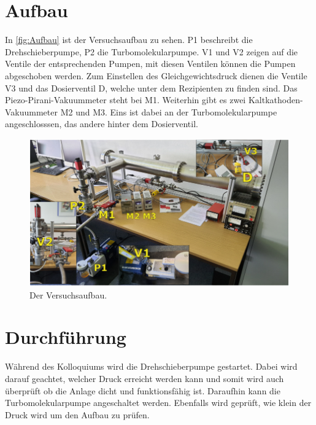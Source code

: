     \section{Aufbau}
        In \autoref{fig:Aufbau} ist der Versuchsaufbau zu sehen.
        P1 beschreibt die Drehschieberpumpe, P2 die Turbomolekularpumpe.
        V1 und V2 zeigen auf die Ventile der entsprechenden Pumpen, mit diesen Ventilen können die Pumpen abgeschoben werden.
        Zum Einstellen des Gleichgewichtsdruck dienen die Ventile V3 und das Dosierventil D, welche unter dem Rezipienten zu finden sind.
        Das Piezo-Pirani-Vakuummeter steht bei M1.
        Weiterhin gibt es zwei Kaltkathoden-Vakuummeter M2 und M3.
        Eins ist dabei an der Turbomolekularpumpe angeschlosssen, das andere hinter dem Dosierventil.

        \begin{figure}[H]
            \centering
            \includegraphics[width=\textwidth]{bilder/Aufbau.png}
            \caption{Der Versuchsaufbau.\cite{anleitung}}
            \label{fig:Aufbau}
        \end{figure}

    \section{Durchführung}
    \label{sec:Durchführung}
        Während des Kolloquiums wird die Drehschieberpumpe gestartet.
        Dabei wird darauf geachtet, welcher Druck erreicht werden kann und somit wird auch überprüft ob die Anlage dicht und funktionsfähig ist.
        Daraufhin kann die Turbomolekularpumpe angeschaltet werden.
        Ebenfalls wird geprüft, wie klein der Druck wird um den Aufbau zu prüfen.


